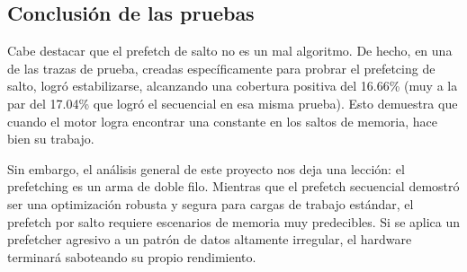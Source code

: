 \documentclass[12pt, a4paper]{article}
\begin{document}
\subsection{Conclusión de las pruebas}
Cabe destacar que el prefetch de salto no es un mal algoritmo. De hecho, en una de las trazas de prueba, creadas específicamente para probrar el prefetcing de salto, logró estabilizarse, alcanzando una cobertura positiva del 16.66\% (muy a la par del 17.04\% que logró el secuencial en esa misma prueba). Esto demuestra que cuando el motor logra encontrar una constante en los saltos de memoria, hace bien su trabajo.

Sin embargo, el análisis general de este proyecto nos deja una lección: el prefetching es un arma de doble filo. Mientras que el prefetch secuencial demostró ser una optimización robusta y segura para cargas de trabajo estándar, el prefetch por salto requiere escenarios de memoria muy predecibles. Si se aplica un prefetcher agresivo a un patrón de datos altamente irregular, el hardware terminará saboteando su propio rendimiento.
\end{document}

